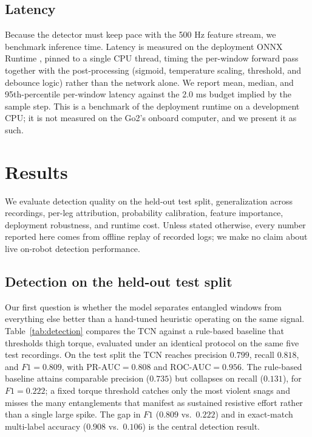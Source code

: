 \documentclass[conference]{IEEEtran}
\begin{document}
\subsection{Latency}
Because the detector must keep pace with the 500 Hz feature stream, we benchmark inference time. Latency is measured on the deployment ONNX Runtime \cite{onnxruntime}, pinned to a single CPU thread, timing the per-window forward pass together with the post-processing (sigmoid, temperature scaling, threshold, and debounce logic) rather than the network alone. We report mean, median, and 95th-percentile per-window latency against the 2.0 ms budget implied by the sample step. This is a benchmark of the deployment runtime on a development CPU; it is not measured on the Go2's onboard computer, and we present it as such.

\section{Results}

We evaluate detection quality on the held-out test split, generalization across recordings, per-leg attribution, probability calibration, feature importance, deployment robustness, and runtime cost. Unless stated otherwise, every number reported here comes from offline replay of recorded logs; we make no claim about live on-robot detection performance.

\subsection{Detection on the held-out test split}
Our first question is whether the model separates entangled windows from everything else better than a hand-tuned heuristic operating on the same signal. Table~\ref{tab:detection} compares the TCN against a rule-based baseline that thresholds thigh torque, evaluated under an identical protocol on the same five test recordings. On the test split the TCN reaches precision $0.799$, recall $0.818$, and $F1 = 0.809$, with $\text{PR-AUC} = 0.808$ and $\text{ROC-AUC} = 0.956$. The rule-based baseline attains comparable precision ($0.735$) but collapses on recall ($0.131$), for $F1 = 0.222$; a fixed torque threshold catches only the most violent snags and misses the many entanglements that manifest as sustained resistive effort rather than a single large spike. The gap in $F1$ ($0.809$ vs.\ $0.222$) and in exact-match multi-label accuracy ($0.908$ vs.\ $0.106$) is the central detection result.
\end{document}
